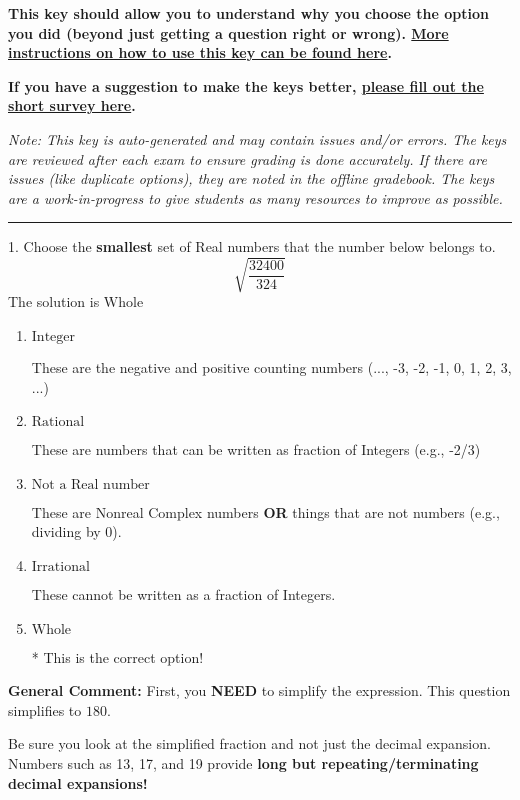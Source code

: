 \documentclass{extbook}[14pt]
\begin{document}
\textbf{This key should allow you to understand why you choose the option you did (beyond just getting a question right or wrong). \href{https://xronos.clas.ufl.edu/mac1105spring2020/courseDescriptionAndMisc/Exams/LearningFromResults}{More instructions on how to use this key can be found here}.}

\textbf{If you have a suggestion to make the keys better, \href{https://forms.gle/CZkbZmPbC9XALEE88}{please fill out the short survey here}.}

\textit{Note: This key is auto-generated and may contain issues and/or errors. The keys are reviewed after each exam to ensure grading is done accurately. If there are issues (like duplicate options), they are noted in the offline gradebook. The keys are a work-in-progress to give students as many resources to improve as possible.}

\rule{\textwidth}{0.4pt}

1. Choose the \textbf{smallest} set of Real numbers that the number below belongs to.
\[ \sqrt{\frac{32400}{324}} \] 
The solution is $ \text{Whole} $ 

\begin{enumerate}[label=\Alph*.] 
\item $ \text{Integer} $ 

 These are the negative and positive counting numbers (..., -3, -2, -1, 0, 1, 2, 3, ...) 
\item $ \text{Rational} $ 

 These are numbers that can be written as fraction of Integers (e.g., -2/3) 
\item $ \text{Not a Real number} $ 

 These are Nonreal Complex numbers \textbf{OR} things that are not numbers (e.g., dividing by 0). 
\item $ \text{Irrational} $ 

 These cannot be written as a fraction of Integers. 
\item $ \text{Whole} $ 

 * This is the correct option! 
\end{enumerate} 
 
\textbf{General Comment:} First, you \textbf{NEED} to simplify the expression. This question simplifies to $180$. 
 
 Be sure you look at the simplified fraction and not just the decimal expansion. Numbers such as 13, 17, and 19 provide \textbf{long but repeating/terminating decimal expansions!} 
 
\end{document}
